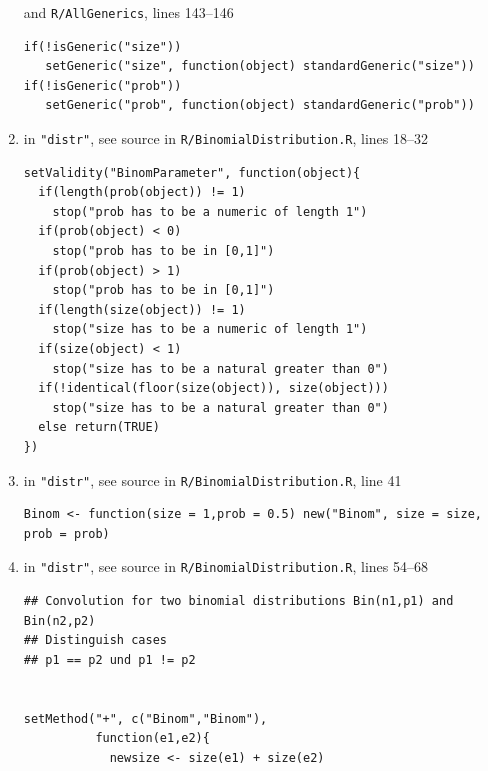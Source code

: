 \documentclass[10pt]{article}
\def\file#1{{\tt #1}}
\def\pkg#1{{\tt "#1"}}
\begin{document}
\begin{enumerate}
\begin{lstlisting}
\end{lstlisting}
and \file{R/AllGenerics}, 
lines 143--146
\Rlstset
\begin{lstlisting}
if(!isGeneric("size")) 
   setGeneric("size", function(object) standardGeneric("size"))
if(!isGeneric("prob")) 
   setGeneric("prob", function(object) standardGeneric("prob"))
\end{lstlisting}
\item in \pkg{distr}, see source in \file{R/BinomialDistribution.R},  
%
lines 18--32
\Rlstset
\begin{lstlisting}
setValidity("BinomParameter", function(object){
  if(length(prob(object)) != 1)
    stop("prob has to be a numeric of length 1")    
  if(prob(object) < 0)
    stop("prob has to be in [0,1]")
  if(prob(object) > 1)
    stop("prob has to be in [0,1]")
  if(length(size(object)) != 1)
    stop("size has to be a numeric of length 1")    
  if(size(object) < 1)
    stop("size has to be a natural greater than 0")
  if(!identical(floor(size(object)), size(object)))
    stop("size has to be a natural greater than 0")    
  else return(TRUE)
})
\end{lstlisting}
\item in \pkg{distr}, see source in \file{R/BinomialDistribution.R},  
%
line 41
\Rlstset
\begin{lstlisting}
Binom <- function(size = 1,prob = 0.5) new("Binom", size = size, prob = prob)
\end{lstlisting}
\item in \pkg{distr}, see source in \file{R/BinomialDistribution.R},  
%
lines 54--68
\Rlstset
\begin{lstlisting}
## Convolution for two binomial distributions Bin(n1,p1) and Bin(n2,p2)
## Distinguish cases 
## p1 == p2 und p1 != p2


setMethod("+", c("Binom","Binom"),
          function(e1,e2){
            newsize <- size(e1) + size(e2)
            

\end{lstlisting}
\end{enumerate}
\end{document}
